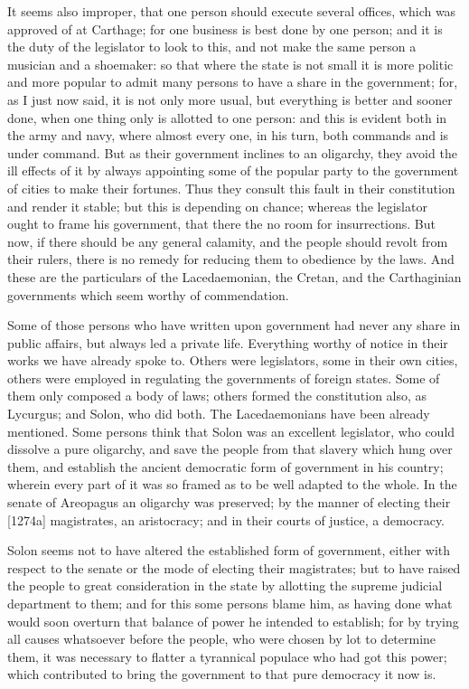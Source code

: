 It seems also improper, that one person should execute several offices,
which was approved of at Carthage; for one business is best done by one
person; and it is the duty of the legislator to look to this, and not make
the same person a musician and a shoemaker: so that where the state is not
small it is more politic and more popular to admit many persons to have a
share in the government; for, as I just now said, it is not only more
usual, but everything is better and sooner done, when one thing only is
allotted to one person: and this is evident both in the army and navy,
where almost every one, in his turn, both commands and is under command.
But as their government inclines to an oligarchy, they avoid the ill
effects of it by always appointing some of the popular party to the
government of cities to make their fortunes. Thus they consult this fault
in their constitution and render it stable; but this is depending on
chance; whereas the legislator ought to frame his government, that there
the no room for insurrections. But now, if there should be any general
calamity, and the people should revolt from their rulers, there is no
remedy for reducing them to obedience by the laws. And these are the
particulars of the Lacedaemonian, the Cretan, and the Carthaginian
governments which seem worthy of commendation.


Some of those persons who have written upon government had never any share
in public affairs, but always led a private life. Everything worthy of
notice in their works we have already spoke to. Others were legislators,
some in their own cities, others were employed in regulating the
governments of foreign states. Some of them only composed a body of laws;
others formed the constitution also, as Lycurgus; and Solon, who did both.
The Lacedaemonians have been already mentioned. Some persons think that
Solon was an excellent legislator, who could dissolve a pure oligarchy,
and save the people from that slavery which hung over them, and establish
the ancient democratic form of government in his country; wherein every
part of it was so framed as to be well adapted to the whole. In the senate
of Areopagus an oligarchy was preserved; by the manner of electing their
[1274a] magistrates, an aristocracy; and in their courts of justice, a
democracy.

Solon seems not to have altered the established form of government, either
with respect to the senate or the mode of electing their magistrates; but
to have raised the people to great consideration in the state by allotting
the supreme judicial department to them; and for this some persons blame
him, as having done what would soon overturn that balance of power he
intended to establish; for by trying all causes whatsoever before the
people, who were chosen by lot to determine them, it was necessary to
flatter a tyrannical populace who had got this power; which contributed to
bring the government to that pure democracy it now is.

